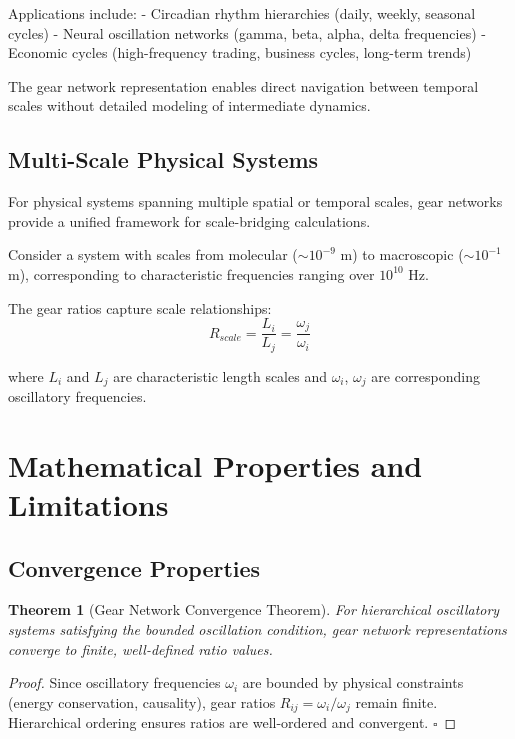 \documentclass[11pt]{article}
\newtheorem{theorem}{Theorem}[section]
\theoremstyle{remark}
\begin{document}
Applications include:
- Circadian rhythm hierarchies (daily, weekly, seasonal cycles)
- Neural oscillation networks (gamma, beta, alpha, delta frequencies)
- Economic cycles (high-frequency trading, business cycles, long-term trends)

The gear network representation enables direct navigation between temporal scales without detailed modeling of intermediate dynamics.

\subsection{Multi-Scale Physical Systems}

For physical systems spanning multiple spatial or temporal scales, gear networks provide a unified framework for scale-bridging calculations.

Consider a system with scales from molecular ($\sim 10^{-9}$ m) to macroscopic ($\sim 10^{-1}$ m), corresponding to characteristic frequencies ranging over $10^{10}$ Hz.

The gear ratios capture scale relationships:
\begin{equation}
R_{scale} = \frac{L_i}{L_j} = \frac{\omega_j}{\omega_i}
\label{eq:scale_gear_ratio}
\end{equation}

where $L_i$ and $L_j$ are characteristic length scales and $\omega_i$, $\omega_j$ are corresponding oscillatory frequencies.

\section{Mathematical Properties and Limitations}

\subsection{Convergence Properties}

\begin{theorem}[Gear Network Convergence Theorem]
For hierarchical oscillatory systems satisfying the bounded oscillation condition, gear network representations converge to finite, well-defined ratio values.
\end{theorem}

\begin{proof}
Since oscillatory frequencies $\omega_i$ are bounded by physical constraints (energy conservation, causality), gear ratios $R_{ij} = \omega_i/\omega_j$ remain finite. Hierarchical ordering ensures ratios are well-ordered and convergent. $\square$
\end{proof}
\end{document}
